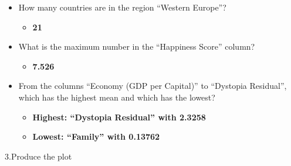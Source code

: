\documentclass[]{book}
\providecommand{\tightlist}{%
  \setlength{\itemsep}{0pt}\setlength{\parskip}{0pt}}
\begin{document}
\begin{itemize}
\tightlist
\item
  How many countries are in the region ``Western Europe''?

  \begin{itemize}
  \tightlist
  \item
    \textbf{21}
  \end{itemize}
\item
  What is the maximum number in the ``Happiness Score'' column?

  \begin{itemize}
  \tightlist
  \item
    \textbf{7.526}
  \end{itemize}
\item
  From the columns ``Economy (GDP per Capital)'' to ``Dystopia
  Residual'', which has the highest mean and which has the lowest?

  \begin{itemize}
  \tightlist
  \item
    \textbf{Highest: ``Dystopia Residual'' with 2.3258}
  \item
    \textbf{Lowest: ``Family'' with 0.13762}
  \end{itemize}
\end{itemize}

3.Produce the plot
\end{document}
